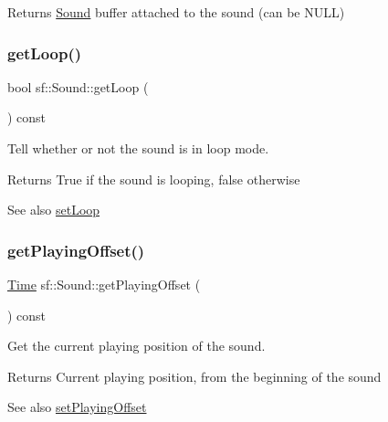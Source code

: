 \begin{DoxyReturn}{Returns}
\hyperlink{classsf_1_1_sound}{Sound} buffer attached to the sound (can be N\+U\+LL) 
\end{DoxyReturn}
\mbox{\label{classsf_1_1_sound_a054da07266ce8f39229495146e3041eb}} 
\subsubsection{\texorpdfstring{get\+Loop()}{getLoop()}}
{\footnotesize\ttfamily bool sf\+::\+Sound\+::get\+Loop (\begin{DoxyParamCaption}{ }\end{DoxyParamCaption}) const}



Tell whether or not the sound is in loop mode. 

\begin{DoxyReturn}{Returns}
True if the sound is looping, false otherwise
\end{DoxyReturn}
\begin{DoxySeeAlso}{See also}
\hyperlink{classsf_1_1_sound_af23ab4f78f975bbabac031102321612b}{set\+Loop} 
\end{DoxySeeAlso}
\mbox{\label{classsf_1_1_sound_a559bc3aea581107bcb380fdbe523aa08}} 
\subsubsection{\texorpdfstring{get\+Playing\+Offset()}{getPlayingOffset()}}
{\footnotesize\ttfamily \hyperlink{classsf_1_1_time}{Time} sf\+::\+Sound\+::get\+Playing\+Offset (\begin{DoxyParamCaption}{ }\end{DoxyParamCaption}) const}



Get the current playing position of the sound. 

\begin{DoxyReturn}{Returns}
Current playing position, from the beginning of the sound
\end{DoxyReturn}
\begin{DoxySeeAlso}{See also}
\hyperlink{classsf_1_1_sound_ab905677846558042022dd6ab15cddff0}{set\+Playing\+Offset} 
\end{DoxySeeAlso}
\mbox{\label{classsf_1_1_sound_a406fc363594a7718a53ebef49a870f51}} 
